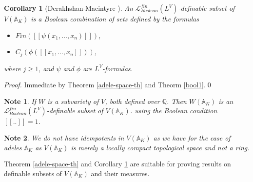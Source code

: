 \documentclass[12pt]{amsart}
\def\A{\mathbb{A}}
\def\Z{\mathbb{Z}}
\def\cL{\mathcal{L}}
\def\Q{\mathbb{Q}}
\def\cL{\mathcal{L}}
\newtheorem{cor}{Corollary}[section]
\numberwithin{equation}{section}
\newtheorem{note}{Note}[section]
\begin{document}
\begin{cor}[Derakhshan-Macintyre {\cite{DM-ad}}]\label{adele-space-cor} 
An $\cL_{Boolean}^{fin}(L^V)$-definable subset of $V(\A_K)$ is a Boolean combination of sets defined by the formulas 
\begin{itemize}
\item $Fin([[\psi(x_1,\dots,x_n)]])$,
\item $C_j(\phi([[x_1,\dots,x_n]]))$,
\end{itemize} 
where $j\geq 1$, and $\psi$ and $\phi$ are $L^V$-formulas.
\end{cor}
\begin{proof} Immediate by Theorem \ref{adele-space-th} and Theorm \ref{bool1}.\qed\end{proof}

\begin{note} If $W$ is a subvariety of $V$, both defined over $\Q$. Then $W(\A_K)$ is an $\cL_{Boolean}^{fin}(L^V)$-definable subset of $V(\A_K)$.
using the Boolean condition $[[..]]=1$.\end{note}

\begin{note} We do not have idempotents in $V(\A_K)$ as we have for the case of adeles $\A_K$ as $V(\A_K)$ is merely a locally compact topological space and not a ring.\end{note}

Theorem \ref{adele-space-th} and Corollary \ref{adele-space-cor} are suitable for proving results on definable subsets of $V(\A_K)$ and their measures.



\

\end{document}
